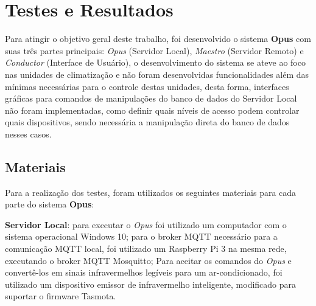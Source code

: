 \chapter{Testes e Resultados}
\label{testes_e_resultados}

% 
% 
% 

Para atingir o objetivo geral deste trabalho, foi desenvolvido o sistema \textbf{Opus} com suas três partes principais:
\emph{Opus} (Servidor Local), \emph{Maestro} (Servidor Remoto) e \emph{Conductor} (Interface de Usuário), o desenvolvimento do sistema se
ateve ao foco nas unidades de climatização e não foram desenvolvidas funcionalidades além das mínimas necessárias para o controle destas unidades,
desta forma, interfaces gráficas para comandos de manipulações do banco de dados do Servidor Local não foram implementadas, 
como definir quais níveis de acesso podem controlar quais dispositivos, sendo necessária a manipulação direta do banco de dados nesses casos.

\section{Materiais}

Para a realização dos testes, foram utilizados os seguintes materiais para cada parte do sistema \textbf{Opus}:

\textbf{Servidor Local}: para executar o \emph{Opus} foi utilizado um computador com o sistema operacional Windows 10; para o broker MQTT necessário
para a comunicação MQTT local, foi utilizado um Raspberry Pi 3 na mesma rede, executando o broker MQTT Mosquitto; Para aceitar os comandos do 
\emph{Opus} e convertê-los em sinais infravermelhos legíveis para um ar-condicionado, foi utilizado um dispositivo emissor de infravermelho inteligente,
modificado para suportar o firmware Tasmota.

